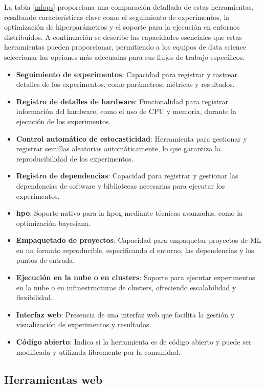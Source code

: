 La tabla \ref{mlops} proporciona una comparación detallada de estas herramientas, resaltando características clave como el seguimiento de experimentos, la optimización de hiperparámetros y el soporte para la ejecución en entornos distribuidos. A continuación se describe las capacidades esenciales que estas herramientas pueden proporcionar, permitiendo a los equipos de data science seleccionar las opciones más adecuadas para sus flujos de trabajo específicos.
\begin{itemize}
    \item \textbf{Seguimiento de experimentos}: Capacidad para registrar y rastrear detalles de los experimentos, como parámetros, métricas y resultados.
    \item \textbf{Registro de detalles de hardware}: Funcionalidad para registrar información del hardware, como el uso de CPU y memoria, durante la ejecución de los experimentos.
    \item \textbf{Control automático de estocasticidad}: Herramienta para gestionar y registrar semillas aleatorias automáticamente, lo que garantiza la reproducibilidad de los experimentos.
    \item \textbf{Registro de dependencias}: Capacidad para registrar y gestionar las dependencias de software y bibliotecas necesarias para ejecutar los experimentos.
    \item \textbf{\acrfull{hpo}}: Soporte nativo para la \gls{hpog} mediante técnicas avanzadas, como la optimización bayesiana.
    \item \textbf{Empaquetado de proyectos}: Capacidad para empaquetar proyectos de ML en un formato reproducible, especificando el entorno, las dependencias y los puntos de entrada.
    \item \textbf{Ejecución en la nube o en clusters}: Soporte para ejecutar experimentos en la nube o en infraestructuras de clusters, ofreciendo escalabilidad y flexibilidad.
    \item \textbf{Interfaz web}: Presencia de una interfaz web que facilita la gestión y visualización de experimentos y resultados.
    \item \textbf{Código abierto}: Indica si la herramienta es de código abierto y puede ser modificada y utilizada libremente por la comunidad.
\end{itemize}

\subsection{Herramientas web}
